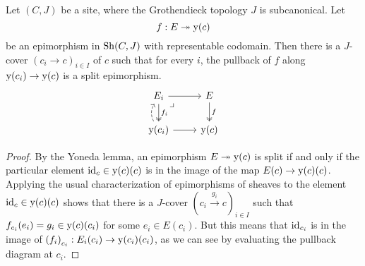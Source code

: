 \begin{lemma}
  Let $(C, J)$ be a site,
  where the Grothendieck topology $J$ is subcanonical.
  Let
  \[ f : E \twoheadrightarrow \mathrm{y}(c) \]
  be an epimorphism in $\mathrm{Sh}(C, J)$ with representable codomain.
  Then there is a $J$-cover $(c_i \to c)_{i \in I}$ of $c$
  such that for every $i$,
  the pullback of $f$ along $\mathrm{y}(c_i) \to \mathrm{y}(c)$
  is a split epimorphism.
  \[ \begin{tikzcd}
    E_i \ar[r] \ar[d, two heads, "f_i"] \ar[dr, phantom, very near start, "\lrcorner"] &
    E \ar[d, two heads, "f"] \\
    \yo(c_i) \ar[r] \ar[u, bend left, dashed]&
    \yo(c)
  \end{tikzcd} \]
\end{lemma}

\begin{proof}
  By the Yoneda lemma,
  an epimorphism $E \twoheadrightarrow \mathrm{y}(c)$ is split
  if and only if
  the particular element $\mathrm{id}_c \in \mathrm{y}(c)(c)$
  is in the image of the map $E(c) \to \mathrm{y}(c)(c)$.
  Applying the usual characterization of epimorphisms of sheaves
  \cite[Corollary III.7.5]{maclane-moerdjik}
  to the element $\mathrm{id}_c \in \mathrm{y}(c)(c)$
  shows that there is a $J$-cover ${(c_i \xrightarrow{g_i} c)}_{i \in I}$
  such that $f_{c_i}(e_i) = g_i \in \mathrm{y}(c)(c_i)$
  for some $e_i \in E(c_i)$.
  But this means that $\mathrm{id}_{c_i}$ is in the image of ${(f_i)}_{c_i} : E_i(c_i) \to \mathrm{y}(c_i)(c_i)$,
  as we can see by evaluating the pullback diagram at $c_i$.
\end{proof}
